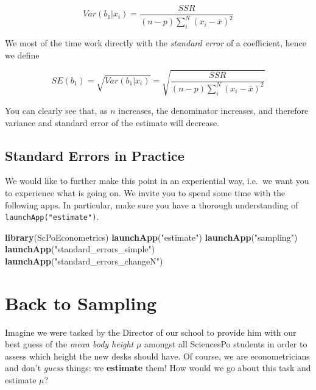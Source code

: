 \documentclass[]{book}
\newenvironment{Shaded}{\begin{snugshade}}{\end{snugshade}}
\newcommand{\KeywordTok}[1]{\textcolor[rgb]{0.13,0.29,0.53}{\textbf{#1}}}
\newcommand{\StringTok}[1]{\textcolor[rgb]{0.31,0.60,0.02}{#1}}
\newcommand{\NormalTok}[1]{#1}
\begin{document}
\begin{equation}
Var(b_1|x_i) = \frac{SSR}{(n-p)\sum_i^N (x_i - \bar{x})^2}  \label{eq:var-ols2}
\end{equation}

We most of the time work directly with the \emph{standard error} of a
coefficient, hence we define

\begin{equation}
SE(b_1) = \sqrt{Var(b_1|x_i)} = \sqrt{\frac{SSR}{(n-p)\sum_i^N (x_i - \bar{x})^2}}  \label{eq:SE-ols2}
\end{equation}

You can clearly see that, as \(n\) increases, the denominator increases,
and therefore variance and standard error of the estimate will decrease.

\subsection{Standard Errors in
Practice}\label{standard-errors-in-practice}

We would like to further make this point in an experiential way, i.e.~we
want you to experience what is going on. We invite you to spend some
time with the following apps. In particular, make sure you have a
thorough understanding of \texttt{launchApp("estimate")}.

\begin{Shaded}
\begin{Highlighting}[]
\KeywordTok{library}\NormalTok{(ScPoEconometrics)}
\KeywordTok{launchApp}\NormalTok{(}\StringTok{"estimate"}\NormalTok{)}
\KeywordTok{launchApp}\NormalTok{(}\StringTok{"sampling"}\NormalTok{)  }
\KeywordTok{launchApp}\NormalTok{(}\StringTok{"standard_errors_simple"}\NormalTok{) }
\KeywordTok{launchApp}\NormalTok{(}\StringTok{"standard_errors_changeN"}\NormalTok{) }
\end{Highlighting}
\end{Shaded}

\section{Back to Sampling}\label{back-to-sampling}

Imagine we were tasked by the Director of our school to provide him with
our best guess of the \emph{mean body height} \(\mu\) amongst all
SciencesPo students in order to assess which height the new desks should
have. Of course, we are econometricians and don't \emph{guess} things:
we \textbf{estimate} them! How would we go about this task and estimate
\(\mu\)?
\end{document}
